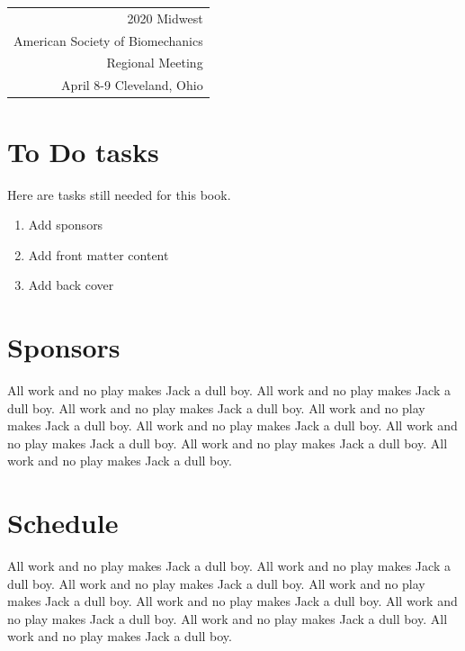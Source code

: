 \documentclass{book}
\begin{document}
\begin{tcolorbox}[notitle,frame hidden,coltext=black,colframe=white,standard jigsaw,opacityback=0,valign=top,width=\textwidth,right=-0.1in,sharp corners=all,boxrule=0mm] %
    \hfill
    \noindent\begin{tabular}{r}
        {\Huge 2020 Midwest} \\[1em] %
        {\Huge American Society of Biomechanics} \\[1em] %
        {\Large Regional Meeting} \\[1em]
        {\large April 8-9  Cleveland, Ohio}
    \end{tabular}

\end{tcolorbox}

\pagebreak
\section*{To Do tasks}
Here are tasks still needed for this book.
\begin{enumerate}
    \item Add sponsors
    \item Add front matter content
    \item Add back cover
\end{enumerate}

\section*{Sponsors}
All work and no play makes Jack a dull boy. All work and no play makes Jack a dull boy. All work and no play makes Jack a dull boy. All work and no play makes Jack a dull boy. All work and no play makes Jack a dull boy. All work and no play makes Jack a dull boy. All work and no play makes Jack a dull boy. All work and no play makes Jack a dull boy. 

\section*{Schedule}
All work and no play makes Jack a dull boy. All work and no play makes Jack a dull boy. All work and no play makes Jack a dull boy. All work and no play makes Jack a dull boy. All work and no play makes Jack a dull boy. All work and no play makes Jack a dull boy. All work and no play makes Jack a dull boy. All work and no play makes Jack a dull boy. 

\pagebreak



\printindex
\end{document}
